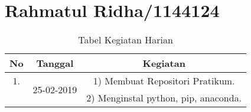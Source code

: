 \chapter{Rahmatul Ridha/1144124}

\begin{table}[h]
\caption{Tabel Kegiatan Harian}
\centering
\begin{tabular}{|c|c|c|}
\hline
No&Tanggal&Kegiatan\\
\hline
1.&\multirow{2}{*}{25-02-2019}&1) Membuat Repositori Pratikum.\\
&&2) Menginstal python, pip, anaconda.\\
\hline
\end{tabular}
\label{table:contoh}
\end{table}
